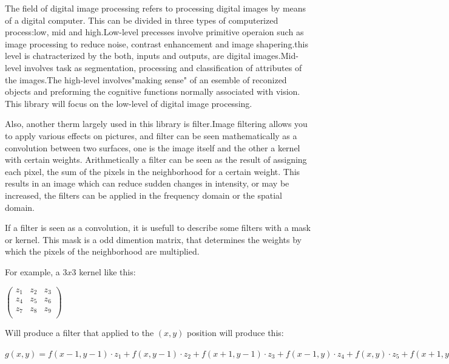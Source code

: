 \documentclass[a4paper]{article}
\begin{document}
The field of digital image processing refers to processing digital images by means of a digital computer. This can be divided in three types of computerized process:low, mid and high.Low-level precesses involve primitive operaion such as image processing to reduce noise, contrast enhancement and image shapering.this level is chatracterized by the both, inputs and outputs, are digital images.Mid-level involves task as segmentation, processing and classification of attributes of the images.The high-level involves"making sense" of an esemble of reconized objects and preforming the cognitive functions normally associated with vision. This library will focus on the low-level of digital image processing.

Also, another therm largely used in this library is filter.Image filtering allows you to apply various effects on pictures, and filter can be seen mathematically as a convolution between two surfaces, one is the image itself and the other a kernel with certain weights.  Arithmetically a filter can be seen as the result of assigning each pixel, the sum of the pixels in the neighborhood for a certain weight. This results in an image which can reduce sudden changes in intensity, or may be increased, the filters can be applied in the frequency domain or the spatial domain. 

If a filter is seen as a convolution, it is usefull to describe some filters with a mask or kernel. This mask is a odd dimention matrix, that determines the weights by which the pixels of the neighborhood are multiplied.

For example, a $3x3$ kernel like this:
\begin{center}
\begin{math}
\begin{pmatrix}
	z_1 & z_2 & z_3 \\
    z_4 & z_5 & z_6 \\
    z_7 & z_8 & z_9 \\
\end{pmatrix}
\end{math}
\end{center}

Will produce a filter that applied to the $(x,y)$ position will produce this:
\begin{center}
\begin{math}
	g(x,y) = f(x-1,y-1)\cdot z_1 + f(x, y-1) \cdot z_2 + f(x+1,y-1)\cdot z_3 + f(x-1, y) \cdot z_4 + f(x,y) \cdot z_5 + f(x+1,y) \cdot z_6 + f(x-1, y+1) \cdot z_7 + f(x, y+1) \cdot z_8 + f(x+1, y+1) \cdot z_9
\end{math}
\end{center}
\end{document}
